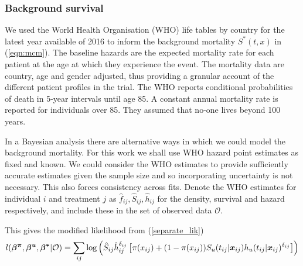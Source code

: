 \documentclass[AMA,STIX1COL]{WileyNJD-v2}
\begin{document}


\subsubsection{Background survival}
We used the World Health Organisation (WHO) life tables by country for the latest year available of 2016
\cite{wholifetables} to inform the background mortality $S^*(t, x)$ in (\ref{eqn:mcm}).
The baseline hazards are the expected mortality rate for each
patient at the age at which they experience the event. The mortality
data are country, age and gender adjusted, thus providing a granular account of
the different patient profiles in the trial.
The WHO reports conditional probabilities of death in 5-year intervals until age 85.
A constant annual mortality rate is reported for individuals over 85.
They assumed that no-one lives beyond 100 years.

In a Bayesian analysis there are alternative ways in which we could
model the background mortality.
For this work we shall use WHO hazard point estimates as fixed and known.
We could consider the WHO estimates to provide sufficiently accurate estimates
given the sample size and so incorporating uncertainty is not necessary.
This also forces consistency across fits.
Denote the WHO estimates for individual $i$ and treatment $j$ as
$\hat{f}_{ij}, \hat{S}_{ij}, \hat{h}_{ij}$ for the density,
survival and hazard respectively, and include these in the set of observed
data $\mathcal{O}$.

This gives the modified likelihood from (\ref{separate_lik})
\begin{equation*}
\mathnormal{l}(\boldsymbol{\beta^{\pi}}, \boldsymbol{\beta^{u}}, \boldsymbol{\beta^*} | \mathcal{O}) =
\sum_{ij} \log\left( \hat{S}_{ij} \hat{h}_{ij}^{\delta_{ij}} \left[\pi(x_{ij}) +
   (1 - \pi(x_{ij})) S_u(t_{ij} | \boldsymbol{x}_{ij}) h_u(t_{ij} | \boldsymbol{x}_{ij})^{\delta_{ij}} \right] \right)
\end{equation*}
\end{document}
